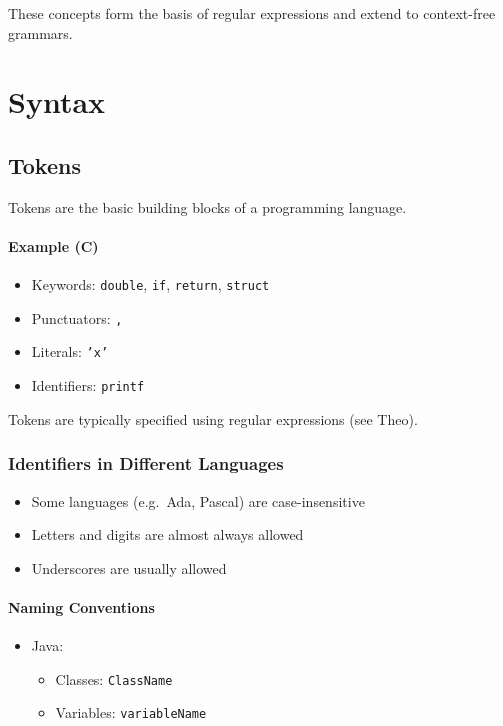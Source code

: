 \documentclass{article}
\begin{document}
These concepts form the basis of regular expressions and extend to context-free grammars.

\section{Syntax}

\subsection{Tokens}
Tokens are the basic building blocks of a programming language.

\paragraph{Example (C)}
\begin{itemize}
  \item Keywords: \texttt{double}, \texttt{if}, \texttt{return}, \texttt{struct}
  \item Punctuators: \texttt{,}
  \item Literals: \texttt{'x'}
  \item Identifiers: \texttt{printf}
\end{itemize}

Tokens are typically specified using regular expressions (see Theo).

\subsubsection{Identifiers in Different Languages}
\begin{itemize}
  \item Some languages (e.g.\ Ada, Pascal) are case-insensitive
  \item Letters and digits are almost always allowed
  \item Underscores are usually allowed
\end{itemize}

\paragraph{Naming Conventions}
\begin{itemize}
  \item Java:
  \begin{itemize}
    \item Classes: \texttt{ClassName}
    \item Variables: \texttt{variableName}
  \end{itemize}
\end{itemize}
\end{document}
